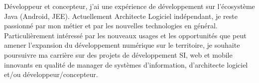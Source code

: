 %
%
%
\par{
Développeur et concepteur, j'ai une expérience de développement sur l'écosystème Java (Android, JEE). Actuellement Architecte Logiciel indépendant,  je reste passionné par mon métier et par les nouvelles technologies en général. Particulièrement intéressé par les nouveaux usages  et les opportunités que peut amener l'expansion du développement numérique sur le territoire, je souhaite poursuivre ma carrière sur des projets de développement SI, web et mobile innovants en qualité de manager de systèmes d'information, d'architecte logiciel et/ou développeur/concepteur.
}